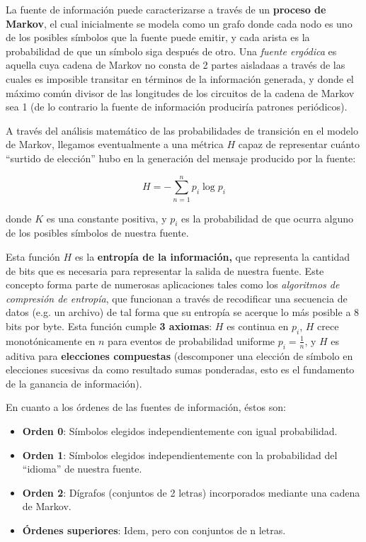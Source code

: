 \documentclass[spanish]{article}
\begin{document}
La fuente de información puede caracterizarse a través de un \textbf{proceso de Markov}, el cual inicialmente se modela como un grafo donde cada nodo es uno de los posibles símbolos que la fuente puede emitir, y cada arista es la probabilidad de que un símbolo siga después de otro. Una \textit{fuente ergódica} es aquella cuya cadena de Markov no consta de 2 partes aisladaas a través de las cuales es imposible transitar en términos de la información generada, y donde el máximo común divisor de las longitudes de los circuitos de la cadena de Markov sea 1 (de lo contrario la fuente de información produciría patrones periódicos). 

A través del análisis matemático de las probabilidades de transición en el modelo de Markov, llegamos eventualmente a una métrica $H$ capaz de representar cuánto ``surtido de elección'' hubo en la generación del mensaje producido por la fuente:

\[
   H = - \sum_{n = 1}^{n} p_i \log p_i
\]

donde $K$ es una constante positiva, y $p_i$ es la probabilidad de que ocurra alguno de los posibles símbolos de nuestra fuente.

Esta función $H$ es la \textbf{entropía de la información,} que representa la cantidad de bits que es necesaria para representar la salida de nuestra fuente. Este concepto forma parte de numerosas aplicaciones tales como los \textit{algoritmos de compresión de entropía}, que funcionan a través de recodificar una secuencia de datos (e.g. un archivo) de tal forma que su entropía se acerque lo más posible a 8 bits por byte. Esta función cumple \textbf{3 axiomas}: $H$ es continua en $p_i$, $H$ crece monotónicamente en $n$ para eventos de probabilidad uniforme $p_i = \frac{1}{n}$, y $H$ es aditiva para \textbf{elecciones compuestas} (descomponer una elección de símbolo en elecciones sucesivas da como resultado sumas ponderadas, esto es el fundamento de la ganancia de información).

En cuanto a los órdenes de las fuentes de información, éstos son:

\begin{itemize}
    \item \textbf{Orden 0}: Símbolos elegidos independientemente con igual probabilidad.
    \item \textbf{Orden 1}: Símbolos elegidos independientemente con la probabilidad del ``idioma'' de nuestra fuente.
    \item \textbf{Orden 2}: Dígrafos (conjuntos de 2 letras) incorporados mediante una cadena de Markov.
    \item \textbf{Órdenes superiores}: Idem, pero con conjuntos de n letras.
\end{itemize}
\end{document}
